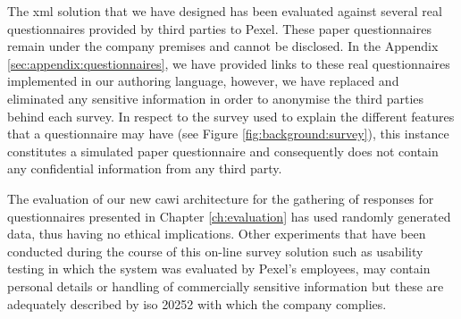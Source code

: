 	The \gls{xml} solution that we have designed has been evaluated against several real questionnaires provided by third parties to Pexel. These paper questionnaires remain under the company premises and cannot be disclosed. In the Appendix \ref{sec:appendix:questionnaires}, we have provided links to these real questionnaires implemented in our authoring language, however, we have replaced and eliminated any sensitive information in order to anonymise the third parties behind each survey. In respect to the survey used to explain the different features that a questionnaire may have (see Figure \ref{fig:background:survey}), this instance constitutes a simulated paper questionnaire and consequently does not contain any confidential information from any third party.

	The evaluation of our new \gls{cawi} architecture for the gathering of responses for questionnaires presented in Chapter \ref{ch:evaluation} has used randomly generated data, thus having no ethical implications. Other experiments that have been conducted during the course of this on-line survey solution such as usability testing in which the system was evaluated by Pexel's employees, may contain personal details or handling of commercially sensitive information but these are adequately described by \gls{iso} 20252 with which the company complies.
